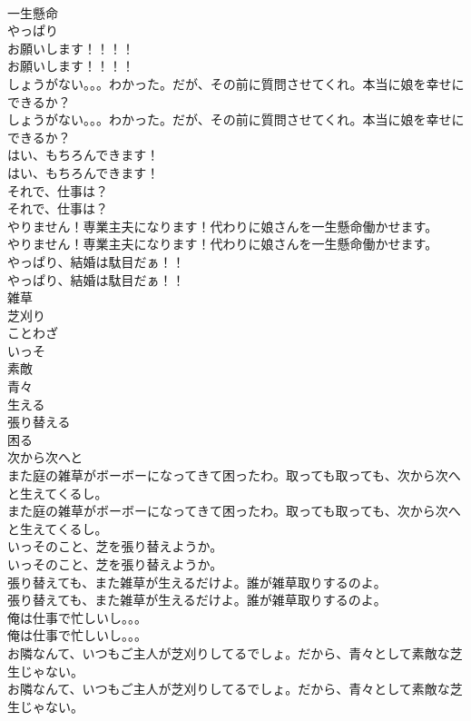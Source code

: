 \documentclass[8pt]{extreport}
\begin{document}
\begin{CJK}{UTF8}{min}
\\	一生懸命
\\	やっぱり
\\	お願いします！！！！	
\\	お願いします！！！！ 
\\	しょうがない。。。わかった。だが、その前に質問させてくれ。本当に娘を幸せにできるか？	
\\	しょうがない。。。わかった。だが、その前に質問させてくれ。本当に娘を幸せにできるか？ 
\\	はい、もちろんできます！	
\\	はい、もちろんできます！ 
\\	それで、仕事は？	
\\	それで、仕事は？ 
\\	やりません！専業主夫になります！代わりに娘さんを一生懸命働かせます。	
\\	やりません！専業主夫になります！代わりに娘さんを一生懸命働かせます。 
\\	やっぱり、結婚は駄目だぁ！！	
\\	やっぱり、結婚は駄目だぁ！！ 
\\	雑草
\\	芝刈り
\\	ことわざ
\\	いっそ
\\	素敵
\\	青々
\\	生える
\\	張り替える
\\	困る
\\	次から次へと
\\	また庭の雑草がボーボーになってきて困ったわ。取っても取っても、次から次へと生えてくるし。	
\\	また庭の雑草がボーボーになってきて困ったわ。取っても取っても、次から次へと生えてくるし。 
\\	いっそのこと、芝を張り替えようか。	
\\	いっそのこと、芝を張り替えようか。 
\\	張り替えても、また雑草が生えるだけよ。誰が雑草取りするのよ。	
\\	張り替えても、また雑草が生えるだけよ。誰が雑草取りするのよ。 
\\	俺は仕事で忙しいし。。。	
\\	俺は仕事で忙しいし。。。 
\\	お隣なんて、いつもご主人が芝刈りしてるでしょ。だから、青々として素敵な芝生じゃない。	
\\	お隣なんて、いつもご主人が芝刈りしてるでしょ。だから、青々として素敵な芝生じゃない。 

\end{CJK}
\end{document}
